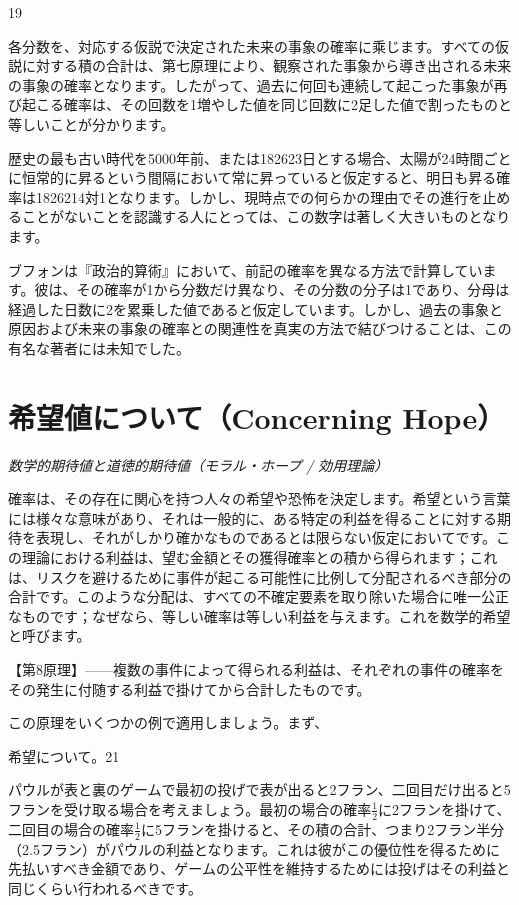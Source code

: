 \documentclass[a4paper,11pt,openany]{ltjsbook}
\begin{document}
19

各分数を、対応する仮説で決定された未来の事象の確率に乘じます。すべての仮説に対する積の合計は、第七原理により、観察された事象から導き出される未来の事象の確率となります。したがって、過去に何回も連続して起こった事象が再び起こる確率は、その回数を1増やした値を同じ回数に2足した値で割ったものと等しいことが分かります。

歴史の最も古い時代を5000年前、または182623日とする場合、太陽が24時間ごとに恒常的に昇るという間隔において常に昇っていると仮定すると、明日も昇る確率は1826214対1となります。しかし、現時点での何らかの理由でその進行を止めることがないことを認識する人にとっては、この数字は著しく大きいものとなります。

ブフォンは『政治的算術』において、前記の確率を異なる方法で計算しています。彼は、その確率が1から分数だけ異なり、その分数の分子は1であり、分母は経過した日数に2を累乗した値であると仮定しています。しかし、過去の事象と原因および未来の事象の確率との関連性を真実の方法で結びつけることは、この有名な著者には未知でした。

\newpage

\chapter{希望値について（Concerning Hope）}
\label{ch:iv}

\begin{center}
\large\textit{数学的期待値と道徳的期待値（モラル・ホープ / 効用理論）}
\end{center}
\vspace{4mm}

確率は、その存在に関心を持つ人々の希望や恐怖を決定します。希望という言葉には様々な意味があり、それは一般的に、ある特定の利益を得ることに対する期待を表現し、それがしかり確かなものであるとは限らない仮定においてです。この理論における利益は、望む金額とその獲得確率との積から得られます；これは、リスクを避けるために事件が起こる可能性に比例して分配されるべき部分の合計です。このような分配は、すべての不確定要素を取り除いた場合に唯一公正なものです；なぜなら、等しい確率は等しい利益を与えます。これを数学的希望と呼びます。

【第8原理】——複数の事件によって得られる利益は、それぞれの事件の確率をその発生に付随する利益で掛けてから合計したものです。

この原理をいくつかの例で適用しましょう。まず、

希望について。21

パウルが表と裏のゲームで最初の投げで表が出ると2フラン、二回目だけ出ると5フランを受け取る場合を考えましょう。最初の場合の確率$\frac{1}{2}$に2フランを掛けて、二回目の場合の確率$\frac{1}{2}$に5フランを掛けると、その積の合計、つまり2フラン半分（2.5フラン）がパウルの利益となります。これは彼がこの優位性を得るために先払いすべき金額であり、ゲームの公平性を維持するためには投げはその利益と同じくらい行われるべきです。
\end{document}
